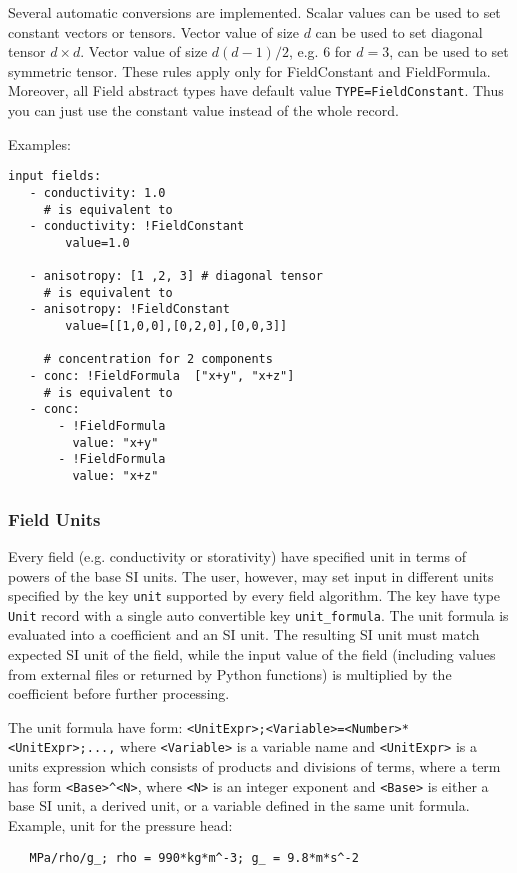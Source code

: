 Several automatic conversions are implemented. Scalar values can be used to set constant vectors or tensors. Vector value of size $d$ can be used to set diagonal tensor $d\times d$.
Vector value of size $d(d-1)/2$, e.g. $6$ for $d=3$, can be used to set symmetric tensor. These rules apply only for FieldConstant and FieldFormula.
Moreover, all Field abstract types have default value \verb'TYPE=FieldConstant'. Thus you can just use the constant value instead of the whole record.

Examples:
\begin{verbatim}
input fields:
   - conductivity: 1.0
     # is equivalent to
   - conductivity: !FieldConstant
        value=1.0
   
   - anisotropy: [1 ,2, 3] # diagonal tensor
     # is equivalent to
   - anisotropy: !FieldConstant
        value=[[1,0,0],[0,2,0],[0,0,3]]

     # concentration for 2 components   
   - conc: !FieldFormula  ["x+y", "x+z"]
     # is equivalent to
   - conc: 
       - !FieldFormula
         value: "x+y"
       - !FieldFormula
         value: "x+z"
\end{verbatim}

\subsubsection{Field Units}
Every field (e.g. conductivity or storativity) have specified unit in terms of powers of the base SI units. 
The user, however, may set input in different units specified by the key \verb'unit' 
supported by every field algorithm. The key have type \verb'Unit' record with a single auto convertible key 
\verb'unit_formula'. The unit formula is evaluated  into a coefficient and an SI unit. The resulting SI unit 
must match expected SI unit of the field, while the input value 
of the field (including values from external files or returned by Python functions)  
is multiplied by the coefficient before further processing.

The unit formula have form: {\tt <UnitExpr>;<Variable>=<Number>*<UnitExpr>;...,}
where {\tt <Variable>} is a variable name and {\tt <UnitExpr>} is a units expression
which consists of products and divisions of terms, where a term has form \verb'<Base>^<N>', 
where {\tt <N>} is an integer exponent and {\tt <Base>} is either a base SI unit, 
a derived unit, or a variable defined in the same unit formula.
Example, unit for the pressure head: 
\begin{verbatim}
   MPa/rho/g_; rho = 990*kg*m^-3; g_ = 9.8*m*s^-2
\end{verbatim}


